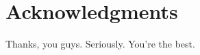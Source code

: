 \chapter*{Acknowledgments} \label{chapter:acknowledgements}

Thanks, you guys. Seriously. You're the best.